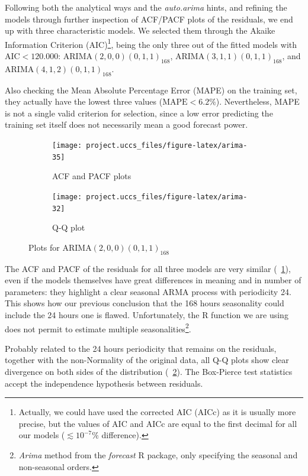 \documentclass[12pt]{article}
\begin{document}
Following both the analytical ways and the \textit{auto.arima} hints, and refining the models through further inspection of ACF/PACF plots of the residuals, we end up with three characteristic models. We selected them through the Akaike Information Criterion (AIC)\footnote{Actually, we could have used the corrected AIC (AICc) as it is usually more precise, but the values of AIC and AICc are equal to the first decimal for all our models ($\lesssim 10^{-7}\%$ difference).}, being the only three out of the fitted models with $\mathrm{AIC} < 120.000$: $\mathrm{ARIMA}(2,0,0)(0,1,1)_{168}$, $\mathrm{ARIMA}(3,1,1)(0,1,1)_{168}$, and $\mathrm{ARIMA}(4,1,2)(0,1,1)_{168}$.

Also checking the Mean Absolute Percentage Error (MAPE) on the training set, they actually have the lowest three values ($\mathrm{MAPE} < 6.2\%$). Nevertheless, MAPE is not a single valid criterion for selection, since a low error predicting the training set itself does not necessarily mean a good forecast power.

\begin{figure}[h]
	\begin{subfigure}{.5\linewidth}
		\texttt{[image: project.uccs\_files/figure-latex/arima-35]}
		\caption{ACF and PACF plots}
		\label{fig:arima-26}
	\end{subfigure}
	\begin{subfigure}{.5\linewidth}
		\texttt{[image: project.uccs\_files/figure-latex/arima-32]}
		\caption{Q-Q plot}
		\label{fig:arima-24}
	\end{subfigure}
	\caption{Plots for $\mathrm{ARIMA}(2,0,0)(0,1,1)_{168}$}
	\label{fig:arima}
\end{figure}
%
The ACF and PACF of the residuals for all three models are very similar (\figurename~\ref{fig:arima-26}), even if the models themselves have great differences in meaning and in number of parameters: they highlight a clear seasonal ARMA process with periodicity 24. This shows how our previous conclusion that the 168 hours seasonality could include the 24 hours one is flawed. Unfortunately, the R function we are using does not permit to estimate multiple seasonalities\footnote{\textit{Arima} method from the \textit{forecast} R package, only specifying the seasonal and non-seasonal orders.}.

Probably related to the 24 hours periodicity that remains on the residuals, together with the non-Normality of the original data, all Q-Q plots show clear divergence on both sides of the distribution (\figurename~\ref{fig:arima-24}). The Box-Pierce test statistics accept the independence hypothesis between residuals.
\end{document}
